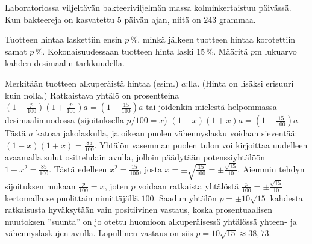\begin{tehtava}
	 Laboratoriossa viljeltävän bakteeriviljelmän massa kolminkertaistuu päivässä. Kun bakteereja on kasvatettu $5$ päivän ajan, niitä on $243$ grammaa. 
	 \begin{vastaus}
	 \end{vastaus}
\end{tehtava}

\begin{tehtava}
Tuotteen hintaa laskettiin ensin $p$\,\%, minkä jälkeen tuotteen hintaa korotettiin samat $p$\,\%. Kokonaisuudessaan tuotteen hinta laski $15$\,\%. Määritä $p$:n lukuarvo kahden desimaalin tarkkuudella.
	\begin{vastaus}
	Merkitään tuotteen alkuperäistä hintaa (esim.) $a$:lla. (Hinta on lisäksi erisuuri kuin nolla.) Ratkaistava yhtälö on prosentteina $(1-\frac{p}{100})(1+\frac{p}{100})a=(1-\frac{15}{100})a$ tai joidenkin mielestä helpommassa desimaalimuodossa (sijoituksella $p/100=x$) $(1-x)(1+x)a=(1-\frac{15}{100})a$. Tästä $a$ katoaa jakolaskulla, ja oikean puolen vähennyslasku voidaan sieventää: $(1-x)(1+x)=\frac{85}{100}$. Yhtälön vasemman puolen tulon voi kirjoittaa uudelleen avaamalla sulut osittelulain avulla, jolloin päädytään potenssiyhtälöön $1-x^2=\frac{85}{100}$. Tästä edelleen $x^2=\frac{15}{100}$, josta $x=\pm \sqrt{\frac{15}{100}}=\pm \frac{\sqrt{15}}{10}$. Aiemmin tehdyn sijoituksen mukaan $\frac{p}{100}=x$, joten $p$ voidaan ratkaista yhtälöstä $\frac{p}{100}=\pm \frac{\sqrt{15}}{10}$ kertomalla se puolittain nimittäjällä $100$. Saadun yhtälön $p=\pm 10\sqrt{15}$ kahdesta ratkaisusta hyväksytään vain positiivinen vastaus, koska prosentuaalisen muutoksen ''suunta'' on jo otettu huomioon alkuperäisessä yhtälössä yhteen- ja vähennyslaskujen avulla. Lopullinen vastaus on siis $p=10\sqrt{15}\approx 38,73$.
	\end{vastaus}
\end{tehtava}

\begin{tehtava}
\begin{vastaus}
\end{vastaus}
\end{tehtava}

\newpage